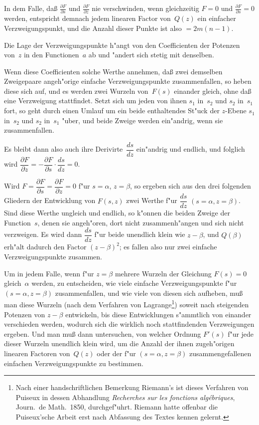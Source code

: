 \documentclass[12pt,a4paper]{book}
\theoremstyle{definition}
\theoremstyle{remark}
\begin{document}
In dem Falle, da\ss{} $\displaystyle\frac{\partial F}{\partial s}$ und $\displaystyle\frac{\partial F}{\partial z}$ nie
verschwinden, wenn gleichzeitig $F = 0$ und $\displaystyle\frac{\partial F}{\partial s} = 0$ werden,
entspricht demnach jedem linearen Factor von~$Q(z)$ ein einfacher
Verzweigungspunkt, und die Anzahl dieser Punkte ist also $= 2m(n-1)$.

Die Lage der Verzweigungspunkte h"angt von den Coefficienten der
Potenzen von~$z$ in den Functionen~$a$ ab und "andert sich stetig mit denselben.

Wenn diese Coefficienten solche Werthe annehmen, da\ss{} zwei demselben
Zweigepaare angeh"orige einfache Verzweigungspunkte zusammenfallen, so
heben diese sich auf, und es werden zwei Wurzeln von~$F(s)$ einander
gleich, ohne da\ss{} eine Verzweigung stattfindet. Setzt sich um jeden von
ihnen $s_1$ in~$s_2$ und $s_2$ in~$s_1$ fort, so geht durch einen Umlauf um ein
beide enthaltendes St"uck der $z$-Ebene $s_1$ in~$s_2$ und $s_2$ in~$s_1$ "uber,
und beide Zweige werden ein"andrig, wenn sie zusammenfallen.

Es bleibt dann also auch ihre Derivirte~$\dfrac{ds}{dz}$ ein"andrig und endlich,
und folglich wird $\dfrac{\partial F}{\partial z} = -\dfrac{\partial F}{\partial s} \cdot \dfrac{ds}{dz} = 0$.

Wird $F = \dfrac{\partial F}{\partial s} = \dfrac{\partial F}{\partial z} = 0$ f"ur $s = \alpha$, $z = \beta$,
so ergeben sich aus den drei folgenden Gliedern der Entwicklung von
$F(s,z)$ zwei Werthe f"ur $\dfrac{ds}{dz}$ $(s = \alpha, z = \beta)$. Sind diese
Werthe ungleich und endlich, so k"onnen die beiden Zweige der Function~$s$,
denen sie angeh"oren, dort nicht zusammenh"angen und sich nicht verzweigen.
Es wird dann $\dfrac{ds}{dz}$ f"ur beide unendlich klein wie $z - \beta$, und $Q(\beta)$
erh"alt dadurch den Factor $(z - \beta)^2$; es fallen also nur zwei einfache
Verzweigungspunkte zusammen.

Um in jedem Falle, wenn f"ur $z = \beta$ mehrere Wurzeln der Gleichung
$F(s) = 0$ gleich~$\alpha$ werden, zu entscheiden, wie viele einfache
Verzweigungspunkte f"ur $(s = \alpha, z = \beta)$ zusammenfallen, und wie viele
von diesen sich aufheben, mu\ss{} man diese Wurzeln (nach dem Verfahren
von Lagrange\footnote{Nach einer handschriftlichen Bemerkung Riemann's
ist dieses Verfahren von Puiseux in dessen Abhandlung \textit{Recherches
sur les fonctions alg\'{e}briques}, Journ.\ de Math.\ 1850, durchgef"uhrt.
Riemann hatte offenbar die Puiseux'sche Arbeit erst nach Abfassung des
Textes kennen gelernt.}) soweit nach steigenden Potenzen von $z - \beta$
entwickeln, bis diese Entwicklungen s"ammtlich von einander verschieden
werden, wodurch sich die wirklich noch stattfindenden Verzweigungen ergeben.
Und man mu\ss{} dann untersuchen, von welcher Ordnung $F'(s)$ f"ur jede
dieser Wurzeln unendlich klein wird, um die Anzahl der ihnen zugeh"origen
linearen Factoren von~$Q(z)$ oder der f"ur $(s = \alpha, z = \beta)$
zusammengefallenen einfachen Verzweigungspunkte zu bestimmen.
\end{document}
